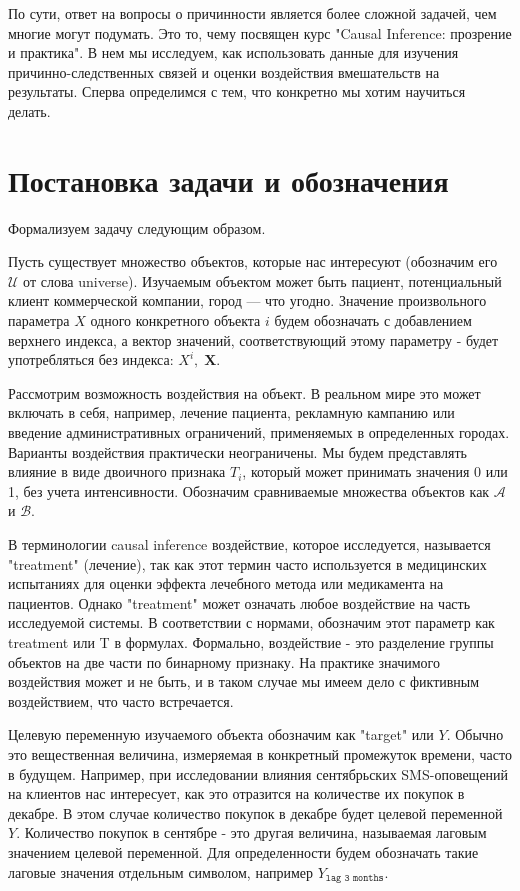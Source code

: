 \documentclass{article}
\newcommand{\coursename}{Causal Inference: прозрение и практика}
\begin{document}
        По сути, ответ на вопросы о причинности является более сложной задачей, чем многие могут подумать. Это то, чему посвящен курс "\coursename". В нем мы исследуем, как использовать данные для изучения причинно-следственных связей и оценки воздействия вмешательств на результаты. Сперва определимся с тем, что конкретно мы хотим научиться делать.

        \newpage

    \section*{Постановка задачи и обозначения}

        Формализуем задачу следующим образом.


        Пусть существует множество объектов, которые нас интересуют (обозначим его $\mathcal{U}$ от слова universe). Изучаемым объектом может быть пациент, потенциальный клиент коммерческой компании, город — что угодно. Значение произвольного параметра $X$ одного конкретного объекта $i$ будем обозначать с добавлением верхнего индекса, а вектор значений, соответствующий этому параметру - будет употребляться без индекса: $X^i,\; \mathbf{X}$.

        Рассмотрим возможность воздействия на объект. В реальном мире это может включать в себя, например, лечение пациента, рекламную кампанию или введение административных ограничений, применяемых в определенных городах. Варианты воздействия практически неограничены. Мы будем представлять влияние в виде двоичного признака $T_i$, который может принимать значения 0 или 1, без учета интенсивности. Обозначим сравниваемые множества объектов как $\mathcal{A}$ и $\mathcal{B}$.


        В терминологии causal inference воздействие, которое исследуется, называется "treatment" (лечение), так как этот термин часто используется в медицинских испытаниях для оценки эффекта лечебного метода или медикамента на пациентов. Однако "treatment" может означать любое воздействие на часть исследуемой системы. В соответствии с нормами, обозначим этот параметр как treatment или T в формулах.
        Формально, воздействие - это разделение группы объектов на две части по бинарному признаку. На практике значимого воздействия может и не быть, и в таком случае мы имеем дело с фиктивным воздействием, что часто встречается.

        Целевую переменную изучаемого объекта обозначим как "target" или $Y$. Обычно это вещественная величина, измеряемая в конкретный промежуток времени, часто в будущем. Например, при исследовании влияния сентябрьских SMS-оповещений на клиентов нас интересует, как это отразится на количестве их покупок в декабре. В этом случае количество покупок в декабре будет целевой переменной $Y$.
        Количество покупок в сентябре - это другая величина, называемая лаговым значением целевой переменной. Для определенности будем обозначать такие лаговые значения отдельным символом, например $Y_{\texttt{lag 3 months}}$.
\end{document}
